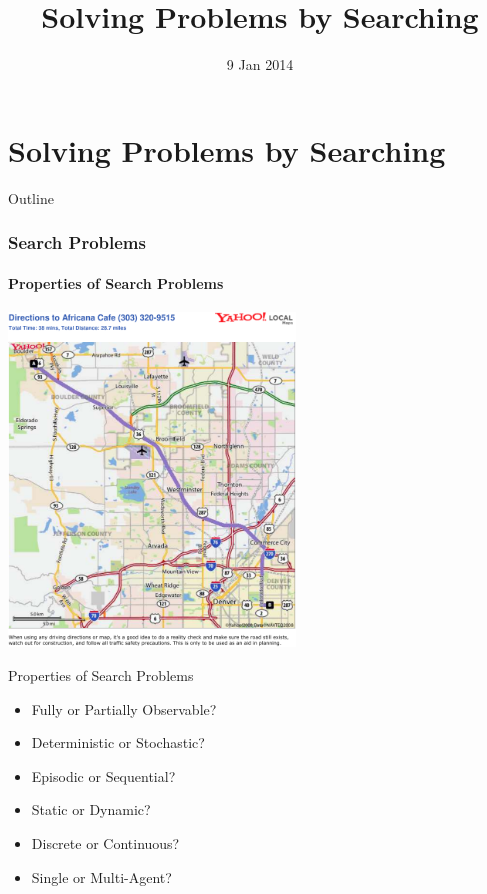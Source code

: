 \documentclass[14pt]{beamer}
\title{Solving Problems by Searching}
\date[]{9 Jan 2014}
\begin{document}
\begin{frame}
  \titlepage
\end{frame}

\part{Solving Problems by Searching}

\begin{frame}{Outline}
	\footnotesize
  \tableofcontents
\end{frame}

\section{Search Problems}

\subsection{Properties of Search Problems}
\begin{frame}[plain]
	\begin{center}
		\includegraphics[width=3in]{cu-to-africana.pdf}
	\end{center}
\end{frame}

\begin{frame}{Properties of Search Problems}
	\begin{itemize}
		\item \alert<2->{Fully} or Partially Observable?
		\item \alert<3->{Deterministic} or Stochastic?
		\item Episodic or \alert<4->{Sequential}?
		\item \alert<5->{Static} or Dynamic?
		\item \alert<6->{Discrete} or Continuous?
		\item \alert<7->{Single} or Multi-Agent?
	\end{itemize}
\end{frame}
\end{document}
